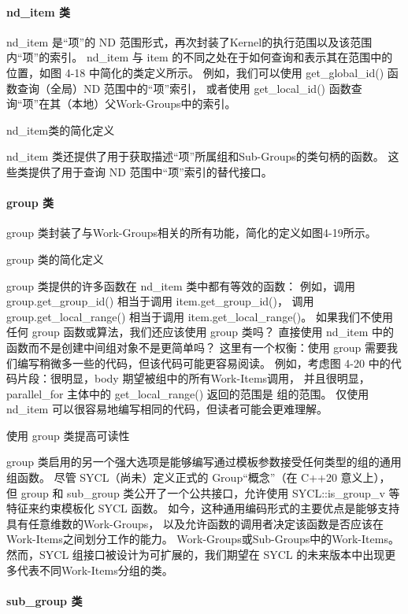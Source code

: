 \paragraph{nd\_item 类}

nd\_item 是“项”的 ND 范围形式，再次封装了Kernel的执行范围以及该范围内“项”的索引。 
nd\_item 与 item 的不同之处在于如何查询和表示其在范围中的位置，如图 4-18 中简化的类定义所示。 
例如，我们可以使用 get\_global\_id() 函数查询（全局）ND 范围中的“项”索引，
或者使用 get\_local\_id() 函数查询“项”在其（本地）父Work-Groups中的索引。

{\color{red} nd\_item类的简化定义}

nd\_item 类还提供了用于获取描述“项”所属组和Sub-Groups的类句柄的函数。 
这些类提供了用于查询 ND 范围中“项”索引的替代接口。

\paragraph{group 类}

group 类封装了与Work-Groups相关的所有功能，简化的定义如图4-19所示。

{\color{red} group 类的简化定义}

group 类提供的许多函数在 nd\_item 类中都有等效的函数：
例如，调用 group.get\_group\_id() 相当于调用 item.get\_group\_id()，
调用 group.get\_local\_range() 相当于调用 item.get\_local\_range()。 
如果我们不使用任何 group 函数或算法，我们还应该使用 group 类吗？ 
直接使用 nd\_item 中的函数而不是创建中间组对象不是更简单吗？ 
这里有一个权衡：使用 group 需要我们编写稍微多一些的代码，但该代码可能更容易阅读。 
例如，考虑图 4-20 中的代码片段：很明显，body 期望被组中的所有Work-Items调用，
并且很明显，parallel\_for 主体中的 get\_local\_range() 返回的范围是 组的范围。 
仅使用 nd\_item 可以很容易地编写相同的代码，但读者可能会更难理解。

{\color{red} 使用 group 类提高可读性}

group 类启用的另一个强大选项是能够编写通过模板参数接受任何类型的组的通用组函数。 
尽管 SYCL（尚未）定义正式的 Group“概念”（在 C++20 意义上），
但 group 和 sub\_group 类公开了一个公共接口，允许使用 SYCL::is\_group\_v 等特征来约束模板化 SYCL 函数。 
如今，这种通用编码形式的主要优点是能够支持具有任意维数的Work-Groups，
以及允许函数的调用者决定该函数是否应该在Work-Items之间划分工作的能力。 Work-Groups或Sub-Groups中的Work-Items。 
然而，SYCL 组接口被设计为可扩展的，我们期望在 SYCL 的未来版本中出现更多代表不同Work-Items分组的类。

\paragraph{sub\_group 类}

